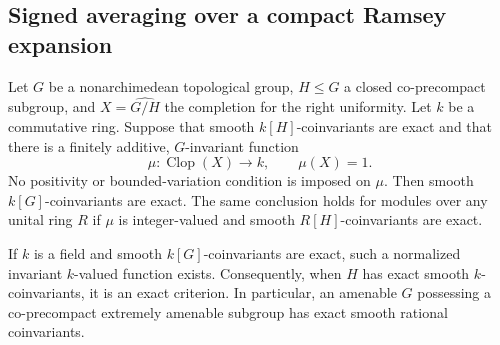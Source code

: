 \subsection{Signed averaging over a compact Ramsey expansion}

\begin{theorem}\label{A:signed-averaging}
Let $G$ be a nonarchimedean topological group, $H\leq G$ a closed
co-precompact subgroup, and $X=\widehat{G/H}$ the completion for the
right uniformity. Let $k$ be a commutative ring. Suppose that smooth
$k[H]$-coinvariants are exact and that there is a finitely additive,
$G$-invariant function
\[
 \mu:\operatorname{Clop}(X)\longrightarrow k,\qquad \mu(X)=1.
\]
No positivity or bounded-variation condition is imposed on $\mu$.
Then smooth $k[G]$-coinvariants are exact. The same conclusion holds
for modules over any unital ring $R$ if $\mu$ is integer-valued and
smooth $R[H]$-coinvariants are exact.

If $k$ is a field and smooth $k[G]$-coinvariants are exact, such a
normalized invariant $k$-valued function exists. Consequently, when
$H$ has exact smooth $k$-coinvariants, it is an exact criterion.
In particular, an amenable $G$ possessing a co-precompact extremely
amenable subgroup has exact smooth rational coinvariants.
\end{theorem}

